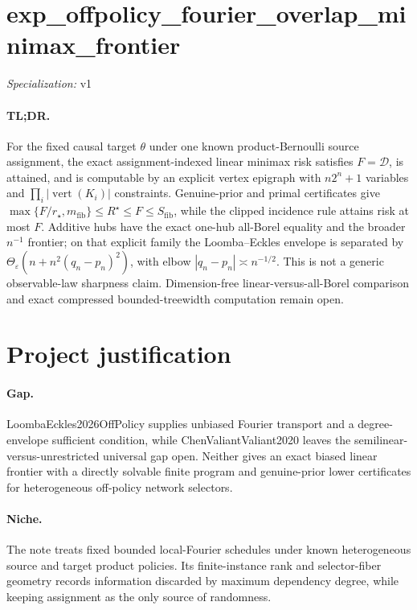 \documentclass{article}
\begin{document}
\sloppy

\section*{exp\_\allowbreak{}offpolicy\_\allowbreak{}fourier\_\allowbreak{}overlap\_\allowbreak{}minimax\_\allowbreak{}frontier}

\noindent\textit{Specialization:} v1\par

\paragraph{TL;DR.} For the fixed causal target \(\theta\) under one known product-Bernoulli source assignment, the exact assignment-indexed linear minimax risk satisfies \(F=\mathcal D\), is attained, and is computable by an explicit vertex epigraph with \(n2^n+1\) variables and \(\prod_i|\operatorname{vert}(K_i)|\) constraints. Genuine-prior and primal certificates give \(\max\{F/r_{\star},m_{\mathrm{fib}}\}\le R^{\star}\le F\le S_{\mathrm{fib}}\), while the clipped incidence rule attains risk at most \(F\). Additive hubs have the exact one-hub all-Borel equality and the broader \(n^{-1}\) frontier; on that explicit family the Loomba--Eckles envelope is separated by \(\Theta_{\varepsilon}(n+n^2(q_n-p_n)^2)\), with elbow \(|q_n-p_n|\asymp n^{-1/2}\). This is not a generic observable-law sharpness claim. Dimension-free linear-versus-all-Borel comparison and exact compressed bounded-treewidth computation remain open.

\section{Project justification}

\paragraph{Gap.} LoombaEckles2026OffPolicy supplies unbiased Fourier transport and a degree-envelope sufficient condition, while ChenValiantValiant2020 leaves the semilinear-versus-unrestricted universal gap open. Neither gives an exact biased linear frontier with a directly solvable finite program and genuine-prior lower certificates for heterogeneous off-policy network selectors.

\paragraph{Niche.} The note treats fixed bounded local-Fourier schedules under known heterogeneous source and target product policies. Its finite-instance rank and selector-fiber geometry records information discarded by maximum dependency degree, while keeping assignment as the only source of randomness.
\end{document}
